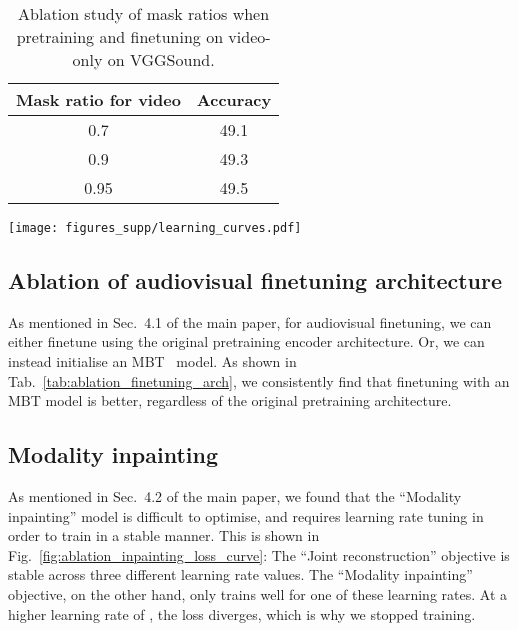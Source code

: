 \documentclass[10pt,twocolumn,letterpaper]{article}
\begin{document}
\begin{table}[tb] 
	\caption{Ablation study of mask ratios when pretraining and finetuning on video-only on VGGSound. 
}
	\vspace{-0.6\baselineskip}
	\centering
		\begin{tabular}{cc}
			\toprule 
			Mask ratio for video &  Accuracy \\
			\midrule
			0.7          & 49.1  \\ 0.9          & 49.3   \\ 0.95         & 49.5 \\ \bottomrule
		\end{tabular}
		\label{tab:ablation_study_mask_ratio_video}
\end{table}  \begin{figure*}[t]
    \centering
    \vspace{-\baselineskip}
    \texttt{[image: figures\_supp/learning\_curves.pdf]} 
    \vspace{-0.7\baselineskip}
    \caption{Learning curves for the ``Joint Reconstruction'' and ``Modality Inpainting'' objectives. Observe how ``Joint Reconstruction'' is stable across a wide range of learning rates. ``Modality Inpainting'', on the other hand, only performs well for a learning rate of , and is unstable at higher values.
    These pretraining experiments were performed on VGGSound for 400 epochs with a batch size of 512.}
	\vspace{-\baselineskip}
    \label{fig:ablation_inpainting_loss_curve} \end{figure*} 
\subsection{Ablation of audiovisual finetuning architecture}

As mentioned in Sec.~4.1 of the main paper, for audiovisual finetuning, we can either finetune using the original pretraining encoder architecture.
Or, we can instead initialise an MBT~\cite{nagrani2021attention} model.
As shown in Tab.~\ref{tab:ablation_finetuning_arch}, we consistently find that finetuning with an MBT model is better, regardless of the original pretraining architecture.

\subsection{Modality inpainting}

As mentioned in Sec.~4.2 of the main paper, we found that the ``Modality inpainting'' model is difficult to optimise, and requires learning rate tuning in order to train in a stable manner.
This is shown in Fig.~\ref{fig:ablation_inpainting_loss_curve}: The ``Joint reconstruction'' objective is stable across three different learning rate values.
The ``Modality inpainting'' objective, on the other hand, only trains well for one of these learning rates. 
At a higher learning rate of , the loss diverges, which is why we stopped training.
\end{document}
